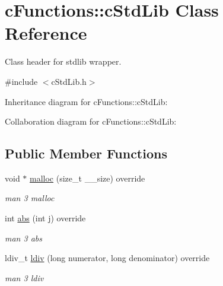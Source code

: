 \hypertarget{classcFunctions_1_1cStdLib}{}\section{c\+Functions\+::c\+Std\+Lib Class Reference}
\label{classcFunctions_1_1cStdLib}


Class header for stdlib wrapper.  




{\ttfamily \#include $<$c\+Std\+Lib.\+h$>$}



Inheritance diagram for c\+Functions\+::c\+Std\+Lib\+:


Collaboration diagram for c\+Functions\+::c\+Std\+Lib\+:
\subsection*{Public Member Functions}
\begin{DoxyCompactItemize}
\item 
\mbox{\label{classcFunctions_1_1cStdLib_a18bd0cdfce864c84bd9c5a7a28309a99}} 
void $\ast$ \mbox{\hyperlink{classcFunctions_1_1cStdLib_a18bd0cdfce864c84bd9c5a7a28309a99}{malloc}} (size\+\_\+t \+\_\+\+\_\+size) override
\begin{DoxyCompactList}\small\item\em man 3 malloc \end{DoxyCompactList}\item 
\mbox{\label{classcFunctions_1_1cStdLib_a72231da60b8202bf4cee50869582828d}} 
int \mbox{\hyperlink{classcFunctions_1_1cStdLib_a72231da60b8202bf4cee50869582828d}{abs}} (int j) override
\begin{DoxyCompactList}\small\item\em man 3 abs \end{DoxyCompactList}\item 
\mbox{\label{classcFunctions_1_1cStdLib_ae273f5b4b2d422187b18b355986e4463}} 
ldiv\+\_\+t \mbox{\hyperlink{classcFunctions_1_1cStdLib_ae273f5b4b2d422187b18b355986e4463}{ldiv}} (long numerator, long denominator) override
\begin{DoxyCompactList}\small\item\em man 3 ldiv \end{DoxyCompactList}\end{DoxyCompactItemize}


